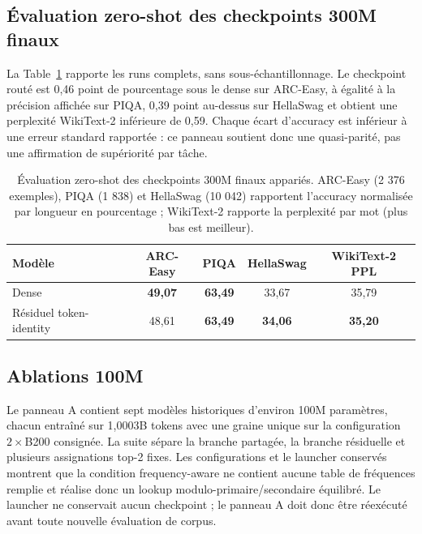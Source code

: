 \documentclass[10pt]{article}
\theoremstyle{definition}
\theoremstyle{remark}
\begin{document}
\subsection{\'{E}valuation zero-shot des checkpoints 300M finaux}
\label{sec:benchmark_300m}

La Table~\ref{tab:benchmark_300m} rapporte les runs complets, sans sous-\'{e}chantillonnage. Le checkpoint rout\'{e} est 0,46 point de pourcentage sous le dense sur ARC-Easy, \`{a} \'{e}galit\'{e} \`{a} la pr\'{e}cision affich\'{e}e sur PIQA, 0,39 point au-dessus sur HellaSwag et obtient une perplexit\'{e} WikiText-2 inf\'{e}rieure de 0,59. Chaque \'{e}cart d'accuracy est inf\'{e}rieur \`{a} une erreur standard rapport\'{e}e : ce panneau soutient donc une quasi-parit\'{e}, pas une affirmation de sup\'{e}riorit\'{e} par t\^{a}che.

\begin{table}[!htbp]
\centering
\small
\caption{\'{E}valuation zero-shot des checkpoints 300M finaux appari\'{e}s. ARC-Easy (2 376 exemples), PIQA (1 838) et HellaSwag (10 042) rapportent l'accuracy normalis\'{e}e par longueur en pourcentage ; WikiText-2 rapporte la perplexit\'{e} par mot (plus bas est meilleur).}
\label{tab:benchmark_300m}
\begin{tabular}{lcccc}
\toprule
\textbf{Mod\`{e}le} & \textbf{ARC-Easy} & \textbf{PIQA} & \textbf{HellaSwag} & \textbf{WikiText-2 PPL} \\
\midrule
Dense & \textbf{49,07} & \textbf{63,49} & 33,67 & 35,79 \\
R\'{e}siduel token-identity & 48,61 & \textbf{63,49} & \textbf{34,06} & \textbf{35,20} \\
\bottomrule
\end{tabular}
\end{table}

\FloatBarrier

\subsection{Ablations 100M}
\label{sec:ablation_100m}

Le panneau A contient sept mod\`{e}les historiques d'environ 100M param\`{e}tres, chacun entra\^{i}n\'{e} sur 1,0003B tokens avec une graine unique sur la configuration $2\times$B200 consign\'{e}e. La suite s\'{e}pare la branche partag\'{e}e, la branche r\'{e}siduelle et plusieurs assignations top-2 fixes. Les configurations et le launcher conserv\'{e}s montrent que la condition frequency-aware ne contient aucune table de fr\'{e}quences remplie et r\'{e}alise donc un lookup modulo-primaire/secondaire \'{e}quilibr\'{e}. Le launcher ne conservait aucun checkpoint ; le panneau A doit donc \^{e}tre r\'{e}ex\'{e}cut\'{e} avant toute nouvelle \'{e}valuation de corpus.
\end{document}

